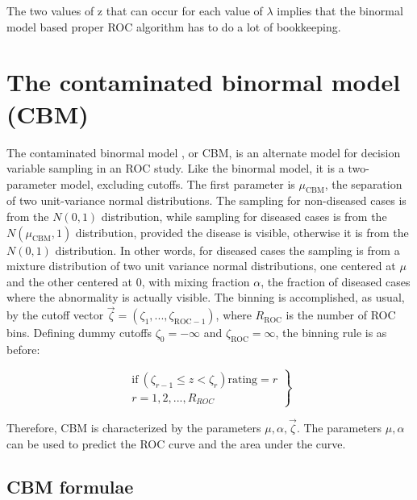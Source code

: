 \documentclass[
]{book}
\begin{document}
The two values of z that can occur for each value of \(\lambda\) implies that the binormal model based proper ROC algorithm has to do a lot of bookkeeping.

\hypertarget{proper-roc-models-cbm}{%
\section{The contaminated binormal model (CBM)}\label{proper-roc-models-cbm}}

The contaminated binormal model \citep{dorfman2000contaminated1, dorfman2000contaminated2, dorfman2000contaminated3}, or CBM, is an alternate model for decision variable sampling in an ROC study. Like the binormal model, it is a two-parameter model, excluding cutoffs. The first parameter is \(\mu_\text{CBM}\), the separation of two unit-variance normal distributions. The sampling for non-diseased cases is from the \(N(0,1)\) distribution, while sampling for diseased cases is from the \(N(\mu_\text{CBM},1)\) distribution, provided the disease is visible, otherwise it is from the \(N(0,1)\) distribution. In other words, for diseased cases the sampling is from a mixture distribution of two unit variance normal distributions, one centered at \(\mu\) and the other centered at 0, with mixing fraction \(\alpha\), the fraction of diseased cases where the abnormality is actually visible. The binning is accomplished, as usual, by the cutoff vector \(\overrightarrow{\zeta}=\left( \zeta_1,...,\zeta_{\text{ROC}-1} \right)\), where \(R_\text{ROC}\) is the number of ROC bins. Defining dummy cutoffs \(\zeta_0=-\infty\) and \(\zeta_{\text{ROC}}=\infty\), the binning rule is as before:

\begin{equation} 
\left.\begin{aligned}
\text{if}~\left (\zeta_{r-1} \le z < \zeta_r  \right ) \text{rating} = r\\
r=1,2,...,R_{ROC} 
\end{aligned}\right\}
\label{eq:proper-roc-models-binning-rule}
\end{equation}

Therefore, CBM is characterized by the parameters \(\mu, \alpha, \overrightarrow{\zeta}\). The parameters \(\mu, \alpha\) can be used to predict the ROC curve and the area under the curve.

\hypertarget{proper-roc-models-cbm-formulae}{%
\subsection{CBM formulae}\label{proper-roc-models-cbm-formulae}}
\end{document}
